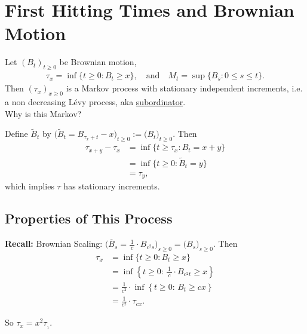 \documentclass[12pt]{article}
\begin{document}
\section{First Hitting Times and Brownian Motion}

Let $(B_t)_{t \geq 0}$ be Brownian motion, 
$$\begin{aligned}
\tau_x = \inf \big\{ t \geq 0 : B_t \geq x \big\}, \quad \text{and} \quad
M_t = \sup \big\{ B_s : 0 \leq s \leq t \big\}.
\end{aligned}$$
Then $(\tau_x)_{x \geq 0}$ is a Markov process with stationary independent increments, 
i.e. a non decreasing L\'evy process, aka \underline{subordinator}. \\

Why is this Markov?

Define $\tilde B_t$ by $\big( \tilde B_t = B_{\tau_{x}+t} - x \big)_{t \geq 0} := \big( B_t \big)_{t \geq 0}$. 
Then
$$\begin{aligned}
\tau_{x+y} - \tau_x 
	&= \inf \big\{ t \geq \tau_x : B_t = x+y \big\} \\
	&= \inf \big\{ t \geq 0 : \tilde B_t = y \big\} \\
	&= \tau_y,
\end{aligned}$$
which implies $\tau$ has stationary increments.

\subsection{Properties of This Process}

\textbf{Recall:} Brownian Scaling: 
$\big( \overline B_s  = \frac{\,1\,}{c} \!\cdot\! B_{c^2 s} \big)_{s \geq 0} = \big( B_s \big)_{s \geq 0}$. Then
$$\begin{aligned}
\tau_x
	&= \inf \big\{ t \geq 0 : B_t \geq x \big\} \\
	&= \inf \left\{ t \geq 0 : \,\frac{\,1\,}{c} \!\cdot\! B_{c^2 t} \geq x \right\} \\
	&= \frac{\,1\,}{c^2} \!\cdot \inf \left\{ t \geq 0 : \,B_{t} \geq cx \right\} \\[2mm]
	&= \frac{\,1\,}{c^2} \!\cdot \tau_{cx}.
\end{aligned}$$

So $\tau_x = x^2 \tau_{_1}$.
\end{document}
